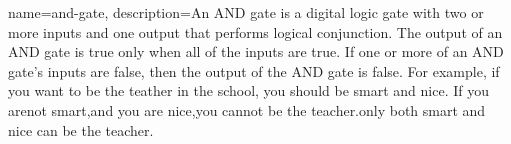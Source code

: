 {
    name=and-gate,
    description={An AND gate is a digital logic gate with two or more inputs and one output that performs logical conjunction. The output of an AND gate is true only when all of the inputs are true. If one or more of an AND gate's inputs are false, then the output of the AND gate is false. For example, if you want to be the teather in the school, you should be smart and nice. If you arenot smart,and you are nice,you cannot be the teacher.only both smart and nice can be the teacher.}
}

